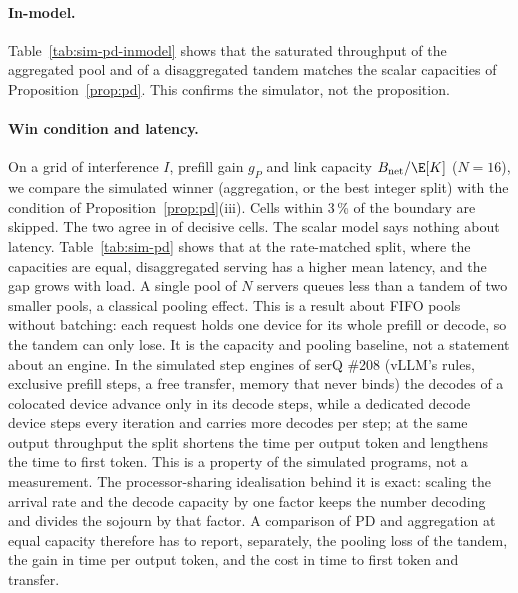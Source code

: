 

\paragraph{In-model.} Table~\ref{tab:sim-pd-inmodel} shows that the
saturated throughput of the aggregated pool and of a disaggregated
tandem matches the scalar capacities of Proposition~\ref{prop:pd}. This
confirms the simulator, not the proposition.



\paragraph{Win condition and latency.} On a grid of interference $I$,
prefill gain $g_P$ and link capacity $B_{\mathrm{net}}/\E[K]$ ($N=16$),
we compare the simulated winner (aggregation, or the best integer split)
with the condition of Proposition~\ref{prop:pd}(iii). Cells within
3\,\% of the boundary are skipped. The two agree in \simPdAgree{} of
\simPdCells{} decisive cells. The scalar model says nothing about
latency. Table~\ref{tab:sim-pd} shows that at the rate-matched split,
where the capacities are equal, disaggregated serving has a higher mean
latency, and the gap grows with load. A single pool of $N$ servers
queues less than a tandem of two smaller pools, a classical pooling
effect. This is a result about FIFO pools without batching: each request
holds one device for its whole prefill or decode, so the tandem can only
lose. It is the capacity and pooling baseline, not a statement about an
engine. In the simulated step engines of serQ \#208 (vLLM's rules,
exclusive prefill steps, a free transfer, memory that never binds) the
decodes of a colocated device advance only in its decode steps, while a
dedicated decode device steps every iteration and carries more decodes
per step; at the same output throughput the split shortens the time per
output token and lengthens the time to first token. This is a property
of the simulated programs, not a measurement. The processor-sharing
idealisation behind it is exact: scaling the arrival rate and the decode
capacity by one factor keeps the number decoding and divides the sojourn
by that factor.
A comparison of PD and aggregation at
equal capacity therefore has to report, separately, the pooling loss of
the tandem, the gain in time per output token, and the cost in time to
first token and transfer.

